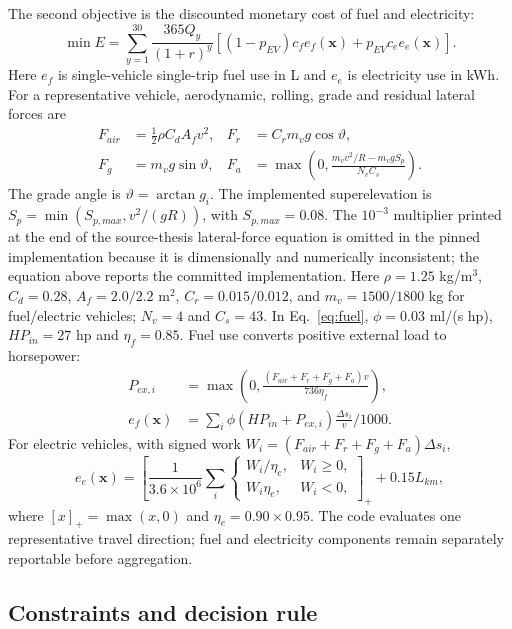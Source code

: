 \documentclass[preprint,12pt]{elsarticle}
\begin{document}
The second objective is the discounted monetary cost of fuel and electricity:
\begin{equation}
\min E=\sum_{y=1}^{30}\frac{365Q_y}{(1+r)^y}
[(1-p_{EV})c_fe_f(\bm x)+p_{EV}c_ee_e(\bm x)].
\label{eq:energy}
\end{equation}
Here $e_f$ is single-vehicle single-trip fuel use in L and $e_e$ is electricity use in kWh. For a representative vehicle, aerodynamic, rolling, grade and residual lateral forces are
\begin{align}
F_{air}&=\tfrac12\rho C_dA_fv^2,&
F_r&=C_rm_vg\cos\vartheta,\\
F_g&=m_vg\sin\vartheta,&
F_a&=\max\left(0,\frac{m_vv^2/R-m_vgS_p}{N_vC_s}\right).
\end{align}
The grade angle is $\vartheta=\arctan g_i$. The implemented superelevation is $S_p=\min(S_{p,max},v^2/(gR))$, with $S_{p,max}=0.08$. The $10^{-3}$ multiplier printed at the end of the source-thesis lateral-force equation is omitted in the pinned implementation because it is dimensionally and numerically inconsistent; the equation above reports the committed implementation. Here $\rho=1.25$ kg/m$^3$, $C_d=0.28$, $A_f=2.0/2.2$ m$^2$, $C_r=0.015/0.012$, and $m_v=1500/1800$ kg for fuel/electric vehicles; $N_v=4$ and $C_s=43$. In Eq.~\eqref{eq:fuel}, $\phi=0.03$ ml/(s hp), $HP_{in}=27$ hp and $\eta_f=0.85$.
Fuel use converts positive external load to horsepower:
\begin{align}
P_{ex,i}&=\max\left(0,\frac{(F_{air}+F_r+F_g+F_a)v}{736\eta_f}\right),\\
e_f(\bm x)&=\sum_i\phi(HP_{in}+P_{ex,i})\frac{\Delta s_i}{v}/1000.
\label{eq:fuel}
\end{align}
For electric vehicles, with signed work $W_i=(F_{air}+F_r+F_g+F_a)\Delta s_i$,
\begin{equation}
e_e(\bm x)=\left[\frac{1}{3.6\times10^6}\sum_i
\begin{cases}W_i/\eta_e,&W_i\geq0,\\W_i\eta_e,&W_i<0,
\end{cases}\right]_+ +0.15L_{km},
\label{eq:ev}
\end{equation}
where $[x]_+=\max(x,0)$ and $\eta_e=0.90\times0.95$. The code evaluates one representative travel direction; fuel and electricity components remain separately reportable before aggregation.

\subsection{Constraints and decision rule}
\end{document}

